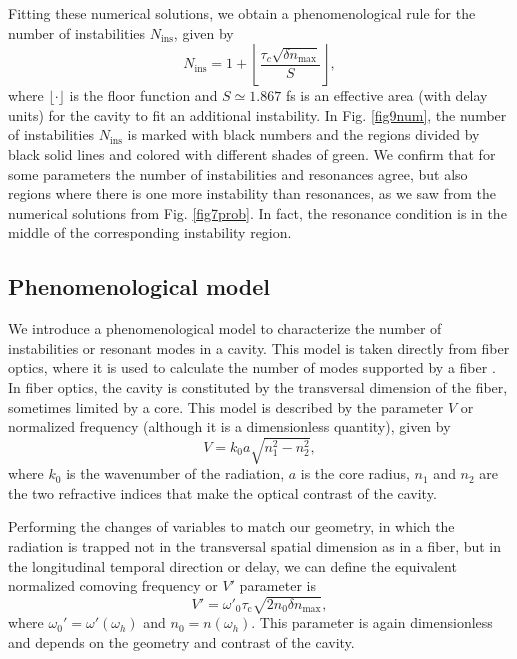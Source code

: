 \documentclass[aps,pra,reprint,amsmath,amssymb,showpacs,groupedaddress,floatfix]{revtex4-1}
\begin{document}
Fitting these numerical solutions, we obtain a phenomenological rule for the number of instabilities $N_\text{ins}$, given by
\begin{equation}\label{mA}
N_\text{ins}= 1 + \left\lfloor \frac{\tau_c\sqrt{\delta n_\text{max}}}{S}\right\rfloor,
\end{equation}
where $\lfloor\cdot\rfloor$ is the floor function and $S\simeq 1.867$ fs is an effective area (with delay units) for the cavity to fit an additional instability. In Fig. \ref{fig9num}, the number of instabilities $N_\text{ins}$ is marked with black numbers and the regions divided by black solid lines and colored with different shades of green. We confirm that for some parameters the number of instabilities and resonances agree, but also regions where there is one more instability than resonances, as we saw from the numerical solutions from Fig. \ref{fig7prob}. In fact, the resonance condition is in the middle of the corresponding instability region.

\subsection{Phenomenological model}
We introduce a phenomenological model to characterize the number of instabilities or resonant modes in a cavity. This model is taken directly from fiber optics, where it is used to calculate the number of modes supported by a fiber \cite{Agrawal2013}. In fiber optics, the cavity is constituted by the transversal dimension of the fiber, sometimes limited by a core. This model is described by the parameter $V$ or normalized frequency (although it is a dimensionless quantity), given by
\begin{equation}
V=k_0 a \sqrt{n_1^2-n_2^2},
\end{equation}
where $k_0$ is the wavenumber of the radiation, $a$ is the core radius, $n_1$ and $n_2$ are the two refractive indices that make the optical contrast of the cavity.

Performing the changes of variables to match our geometry, in which the radiation is trapped not in the transversal spatial dimension as in a fiber, but in the longitudinal temporal direction or delay, we can define the equivalent normalized comoving frequency or $V'$ parameter is
\begin{equation}\label{pheno}
V'=\omega'_0\tau_\text{c}\sqrt{2 n_0\delta n_\text{max}},%
\end{equation}
where $\omega_0'=\omega'(\omega_h)$ and $n_0=n(\omega_h)$. This parameter is again dimensionless and depends on the geometry and contrast of the cavity.
\end{document}
